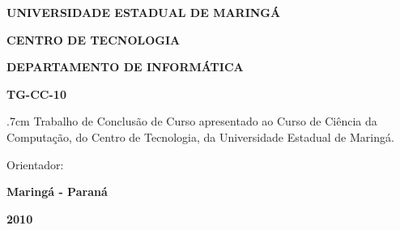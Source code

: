 
\vspace{4cm}

\begin{center}

\textbf{UNIVERSIDADE ESTADUAL DE MARINGÁ}

\textbf{CENTRO DE TECNOLOGIA}

\textbf{DEPARTAMENTO DE INFORMÁTICA}

\vspace{4cm}

\textbf{\doctitulo}

\vspace{1cm}

\docautor

\vspace{1cm}

\textbf{TG-CC-10}

\end{center}

\vspace{3cm}

\begin{flushright}
\parbox{9cm}
{
\baselineskip .7cm
Trabalho de Conclusão de Curso apresentado ao Curso de Ciência da Computação,
do Centro de Tecnologia, da Universidade Estadual de Maringá.

Orientador: \docorient
}
\end{flushright}

\vspace{5cm}

\begin{center}
\centering
\textbf{Maringá - Paraná}

\textbf{2010}
\end{center}


\pagebreak
